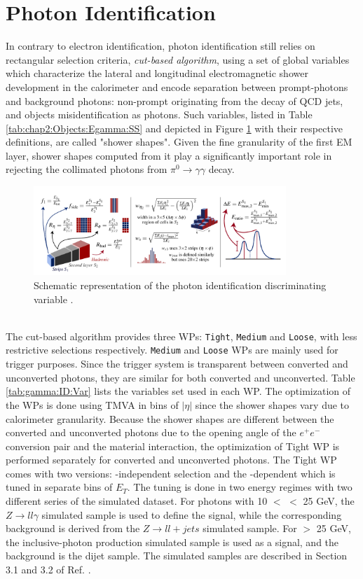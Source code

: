 \section{Photon Identification}
\label{gamma:ID}
In contrary to electron identification, photon identification still relies on rectangular selection criteria, \textit{cut-based algorithm}, using a set of global variables which characterize the lateral and longitudinal electromagnetic shower development in the calorimeter and encode separation between prompt-photons and background photons: non-prompt originating from the decay of QCD jets, and objects misidentification as photons. Such variables, listed in Table \ref{tab:chap2:Objects:Egamma:SS} and depicted in Figure \ref{fig:gamma:ID:SS} with their respective definitions, are called "shower shapes". Given the fine granularity of the first EM layer, shower shapes computed from it play a significantly important role in rejecting the collimated photons from $\pi^{0} \rightarrow\gamma\gamma$ decay. \\ 
\begin{figure}[htbp]
    \centering
    \includegraphics[width=0.85\textwidth]{Ch3/Img/ShowerShapes.png}
    \caption{Schematic representation of the photon identification discriminating variable \cite{ShowerShapes_fig}.}
    \label{fig:gamma:ID:SS}
\end{figure}
\\
The cut-based algorithm provides three WPs: \texttt{Tight}, \texttt{Medium} and \texttt{Loose}, with less restrictive selections respectively. \texttt{Medium} and \texttt{Loose} WPs are mainly used for trigger purposes. Since the trigger system is transparent between converted and unconverted photons, they are similar for both converted and unconverted. Table \ref{tab:gamma:ID:Var} lists the variables set used in each WP. The optimization of the WPs is done using TMVA \cite{TMVA} in bins of $|\eta|$ since the shower shapes vary due to calorimeter granularity. Because the shower shapes are different between the converted and unconverted photons due to the opening angle of the $e^+e^-$ conversion pair and the material interaction, the optimization of Tight WP is performed separately for converted and unconverted photons. The Tight WP comes with two versions: \eT-independent selection and the \eT-dependent which is tuned in separate bins of $E_T$. The tuning is done in two energy regimes with two different series of the simulated dataset. For photons with 10 $<$ \eT $<$ 25 GeV, the $Z\rightarrow ll\gamma$ simulated sample is used to define the signal, while the corresponding background is derived from the $Z\rightarrow ll+jets$ simulated sample. For \eT $>$ 25 GeV, the inclusive-photon production simulated sample is used as a signal, and the background is the dijet sample. The simulated samples are described in Section 3.1 and 3.2 of Ref. \cite{Egamma_Perf_2017}.   
